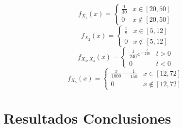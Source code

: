 \documentclass{sig-alternate}
\begin{document}
\begin{equation}
f_{X_1}(x) =
\begin{cases}
\frac{1}{30} & x \in [20,50] \\
0 & x \notin [20, 50]
\end{cases}
\end{equation}
\begin{equation}
f_{X_2}(x) =
\begin{cases}
\frac{1}{7} & x \in [5,12] \\
0 & x \notin [5,12]
\end{cases}
\end{equation}
\begin{equation}
f_{X_3, X_4}(x) =
  \begin{cases}
    \frac{1}{240} e^{-\frac{t}{240}} & t > 0 \\
    0 & t < 0
  \end{cases}
\end{equation}
\begin{equation}
f_{X_5}(x) =
\begin{cases}
\frac{x}{1800} - \frac{1}{150} & x \in [12,72] \\
0 & x \notin [12,72]
\end{cases}
\end{equation}

\newpage

\section{Resultados Conclusiones}
\label{sec:conclusiones}

\end{document}
